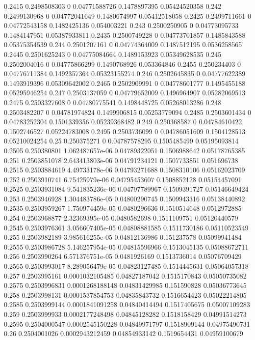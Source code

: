 {0.2415 0.2498508303 0 0.04771588726 0.1478897395 0.05424520358
0.242 0.2499130968 0 0.04772041649 0.1480674997 0.05412518058
0.2425 0.2499711661 0 0.04772543158 0.1482425136 0.054003221
0.243 0.2500250905 0 0.04773095733 0.1484147951 0.05387933811
0.2435 0.2500749228 0 0.04773701857 0.1485843588 0.05375354539
0.244 0.2501207161 0 0.04774364009 0.1487512195 0.0536258565
0.2445 0.2501625243 0 0.04775084664 0.1489153923 0.05349628535
0.245 0.2502004016 0 0.04775866299 0.1490768926 0.053364846
0.2455 0.250234403 0 0.04776711384 0.1492357364 0.05323155274
0.246 0.2502645835 0 0.04777622389 0.1493919396 0.05309642002
0.2465 0.2502909991 0 0.04778601777 0.1495455188 0.05295946254
0.247 0.2503137059 0 0.04779652009 0.1496964907 0.05282069513
0.2475 0.2503327608 0 0.04780775541 0.1498448725 0.05268013286
0.248 0.2503482207 0 0.04781974824 0.1499906815 0.05253779094
0.2485 0.2503601434 0 0.04783252304 0.1501339356 0.05239368482
0.249 0.250368587 0 0.04784610422 0.1502746527 0.05224783008
0.2495 0.2503736099 0 0.04786051609 0.1504128513 0.05210024254
0.25 0.250375271 0 0.04787578295 0.1505485499 0.05195093814
0.2505 0.250380801 1.062487657e-06 0.04789322051 0.1506988642 0.05178765385
0.251 0.2503851078 2.643413803e-06 0.04791234121 0.1507733851 0.051696738
0.2515 0.2503884619 4.49733178e-06 0.04793271688 0.1508310106 0.05162023709
0.252 0.2503910741 6.75425979e-06 0.04795453607 0.1508852128 0.05154457091
0.2525 0.2503931084 9.541835236e-06 0.04797789967 0.1509391727 0.05146649424
0.253 0.2503946928 1.304483786e-05 0.04800290745 0.1509943316 0.05138440892
0.2535 0.2503959267 1.750974459e-05 0.0480296636 0.1510514648 0.0512972885
0.254 0.2503968877 2.32369395e-05 0.0480582698 0.1511109751 0.05120440579
0.2545 0.2503976361 3.056607405e-05 0.04808881585 0.1511730186 0.05110523549
0.255 0.2503982189 3.985616255e-05 0.04812136986 0.151237578 0.05099941484
0.2555 0.2503986728 5.146257954e-05 0.04815596966 0.1513045135 0.05088672711
0.256 0.2503990264 6.571376751e-05 0.0481926169 0.1513736014 0.05076709429
0.2565 0.2503993017 8.289056479e-05 0.04823127485 0.1514445631 0.05064057318
0.257 0.2503995161 0.0001032105485 0.04827187042 0.1515170843 0.05050735082
0.2575 0.2503996831 0.0001268188148 0.04831429985 0.151590828 0.05036773645
0.258 0.2503998131 0.0001537854753 0.04835843732 0.1516654423 0.05022214805
0.2585 0.2503999144 0.0001841091258 0.04840414494 0.1517405675 0.05007109283
0.259 0.2503999933 0.0002177248498 0.04845128282 0.1518158429 0.04991514273
0.2595 0.2504000547 0.0002545150228 0.04849971797 0.1518909144 0.04975490731
0.26 0.2504001026 0.0002943212459 0.04854933142 0.1519654431 0.04959100679
}
